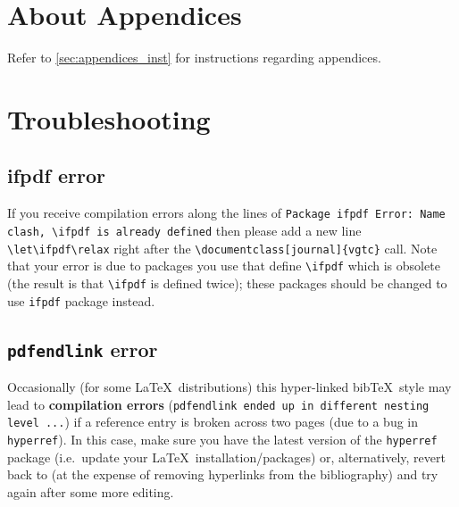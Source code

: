 \documentclass[journal]{vgtc}                %
\begin{document}

%
%
%





\appendix

\section{About Appendices}
Refer to \cref{sec:appendices_inst} for instructions regarding appendices.

\section{Troubleshooting}
\label{appendix:troubleshooting}

\subsection{ifpdf error}

If you receive compilation errors along the lines of \texttt{Package ifpdf Error: Name clash, \textbackslash ifpdf is already defined} then please add a new line \verb|\let\ifpdf\relax| right after the \verb|\documentclass[journal]{vgtc}| call.
Note that your error is due to packages you use that define \verb|\ifpdf| which is obsolete (the result is that \verb|\ifpdf| is defined twice); these packages should be changed to use \verb|ifpdf| package instead.


\subsection{\texttt{pdfendlink} error}

Occasionally (for some \LaTeX\ distributions) this hyper-linked bib\TeX\ style may lead to \textbf{compilation errors} (\texttt{pdfendlink ended up in different nesting level ...}) if a reference entry is broken across two pages (due to a bug in \verb|hyperref|).
In this case, make sure you have the latest version of the \verb|hyperref| package (i.e.\ update your \LaTeX\ installation/packages) or, alternatively, revert back to \verb|| (at the expense of removing hyperlinks from the bibliography) and try \verb|| again after some more editing.
\end{document}
